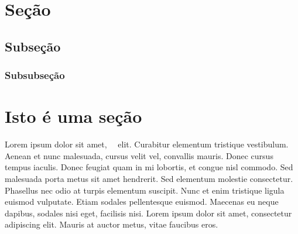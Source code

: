 \section{Seção}
\subsection{Subseção}
\subsubsection{Subsubseção}

\section{Isto é uma seção}
Lorem ipsum dolor sit amet,\ \  elit. Curabitur elementum tristique vestibulum. Aenean et nunc malesuada, cursus velit vel, convallis mauris. Donec cursus tempus iaculis. Donec feugiat quam in mi lobortis, et congue nisl commodo. Sed malesuada porta metus sit amet hendrerit. Sed elementum molestie consectetur. Phasellus nec odio at turpis elementum suscipit. Nunc et enim tristique ligula euismod vulputate. Etiam sodales pellentesque euismod. Maecenas eu neque dapibus, sodales nisi eget, facilisis nisi. Lorem ipsum dolor sit amet, consectetur adipiscing elit. Mauris at auctor metus, vitae faucibus eros.
